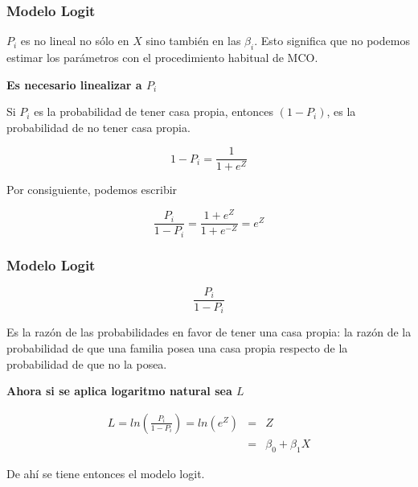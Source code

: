 \documentclass[10pt]{beamer}
\begin{document}
\begin{frame}
\frametitle{Modelo Logit}

$P_i$ es no lineal no sólo en $X$ sino también en las $\beta_i$. Esto significa que no podemos estimar los parámetros con el procedimiento habitual de MCO.


\vspace{4mm}

\textbf{Es necesario linealizar a $P_i$}

\vspace{4mm}

Si $P_i$ es la probabilidad de tener casa propia, entonces $(1 - P_i)$, es la probabilidad de no tener casa propia.


\begin{equation}
1 - P_i = \frac{1}{1 + e^{Z}}
\end{equation}

\vspace{4mm}

Por consiguiente, podemos escribir

\begin{equation}
\frac{P_i}{1 - P_i} = \frac{1 + e^{Z}}{1 + e^{-Z}} = e^{Z}
\end{equation}



\end{frame}





\begin{frame}
\frametitle{Modelo Logit}

\begin{equation}
\frac{P_i}{1 - P_i}
\end{equation}

\vspace{4mm}

Es la razón de las probabilidades en favor de tener una casa propia: la razón de la probabilidad de que una familia posea una casa propia respecto de la probabilidad de que no la posea. 

\vspace{4mm}

\textbf{Ahora si se aplica logaritmo natural sea $L$}

\vspace{4mm}

\begin{eqnarray}
L = ln \left(  \frac{P_i}{1 - P_i} \right)  = ln (e^{Z}) & = & Z \\
 & = &  \beta_0 + \beta_1 X
\end{eqnarray}

De ahí se tiene entonces el modelo logit.
\end{frame}
\end{document}
